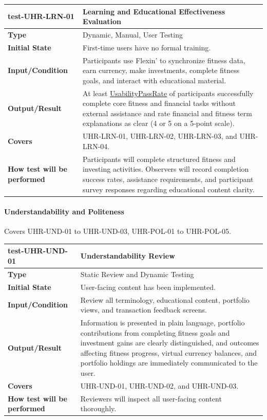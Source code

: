 \documentclass[12pt, titlepage]{article}
\newcommand{\const}[1]{\hyperlink{const:#1}{\textsf{#1}}}
\begin{document}
\noindent\begin{tabularx}{\textwidth}{>{\raggedright\arraybackslash}p{3.5cm}X}
  \toprule
  \textbf{test-UHR-LRN-01} & \textbf{Learning and Educational Effectiveness Evaluation}\\
  \midrule
  \textbf{Type} & Dynamic, Manual, User Testing\\
  \textbf{Initial State} & First-time users have no formal training.\\
  \textbf{Input/Condition} & Participants use Flexin' to synchronize fitness data, earn currency, make investments, complete fitness goals, and interact with educational material.\\
  \textbf{Output/Result} & At least \const{UsabilityPassRate} of participants successfully complete core fitness and financial tasks without external assistance and rate financial and fitness term explanations as clear (4 or 5 on a 5-point scale).\\
  \textbf{Covers} & UHR-LRN-01, UHR-LRN-02, UHR-LRN-03, and UHR-LRN-04.\\
  \textbf{How test will be performed} & Participants will complete structured fitness and investing activities. Observers will record completion success rates, assistance requirements, and participant survey responses regarding educational content clarity.\\
  \bottomrule
\end{tabularx}

\paragraph{Understandability and Politeness}

Covers UHR-UND-01 to UHR-UND-03, UHR-POL-01 to UHR-POL-05.

\noindent\begin{tabularx}{\textwidth}{>{\raggedright\arraybackslash}p{3.5cm}X}
  \toprule
  \textbf{test-UHR-UND-01} & \textbf{Understandability Review}\\
  \midrule
  \textbf{Type} & Static Review and Dynamic Testing\\
  \textbf{Initial State} & User-facing content has been implemented.\\
  \textbf{Input/Condition} & Review all terminology, educational content, portfolio views, and transaction feedback screens.\\
  \textbf{Output/Result} & Information is presented in plain language, portfolio contributions from completing fitness goals and investment gains are clearly distinguished, and outcomes affecting fitness progress, virtual currency balances, and portfolio holdings are immediately communicated to the user.\\
  \textbf{Covers} & UHR-UND-01, UHR-UND-02, and UHR-UND-03.\\
  \textbf{How test will be performed} & Reviewers will inspect all user-facing content thoroughly.\\
  \bottomrule
\end{tabularx}
\end{document}
